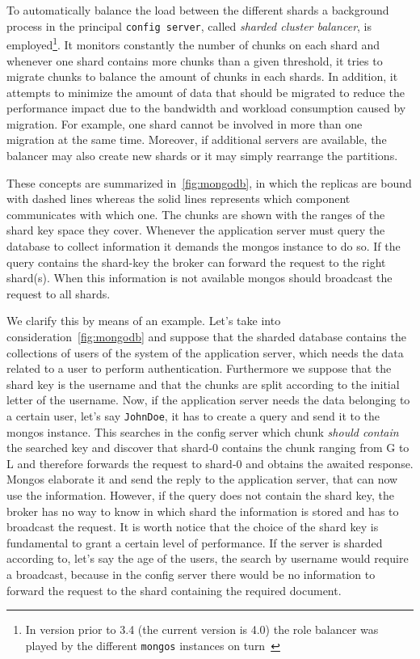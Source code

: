 To automatically balance the load between the different shards a background
process in the principal \texttt{config server}, called \emph{sharded cluster
balancer},
is employed\footnote{In version prior to 3.4 (the current version is 4.0) the
role balancer was played by the different \texttt{mongos}
instances on turn~\cite{bib:mongodb-docs}}. It monitors constantly the number
of chunks on each shard and  whenever one  shard contains more chunks than a
given threshold, it tries to migrate chunks to balance the amount of chunks
in each shards. In addition, it attempts to minimize the amount of data
that should be migrated to reduce the performance impact due to the bandwidth
and workload consumption caused by migration. For example, one shard cannot be
involved in more than one migration at the same time. Moreover, if additional
servers are available, the balancer may also create new shards or it may simply
rearrange the partitions.

These concepts are summarized in~\autoref{fig:mongodb}, in which the replicas
are bound with dashed lines whereas the solid lines represents which
component communicates with which one. The chunks are shown with the
ranges of the shard key space they cover.
Whenever the application server must query the database to collect information
it demands the mongos instance to do so. If the query contains the shard-key
the broker can forward the request to the right shard(s). When this information
is not available mongos should broadcast the request to all shards.

We clarify this by means of an example. Let's take into
consideration~\autoref{fig:mongodb} and suppose that the sharded database
contains the collections of users of the system of the application server,
which needs the data related to a user to perform authentication.
Furthermore we suppose that the shard key is the username and that the chunks
are split according to the initial letter of the username. Now, if the
application server needs the data belonging to a certain user, let's say
\texttt{JohnDoe}, it has to create a query and send it to the mongos instance.
This searches in the config server which chunk \emph{should contain} the
searched key and discover that shard-0 contains the chunk ranging from G to L
and therefore forwards the request to shard-0 and obtains the awaited response.
Mongos elaborate it and send the reply to the application server, that can now
use the information. However, if the query does not contain the shard key, the
broker has no way to know in which shard the information is stored and has to
broadcast the request.
It is worth notice that the choice of the shard key is fundamental to grant a
certain level of performance. If the server is sharded according to, let's say
the age of the users, the search by username would require a broadcast, because
in the config server there would be no information to forward the request to
the shard containing the required document.




